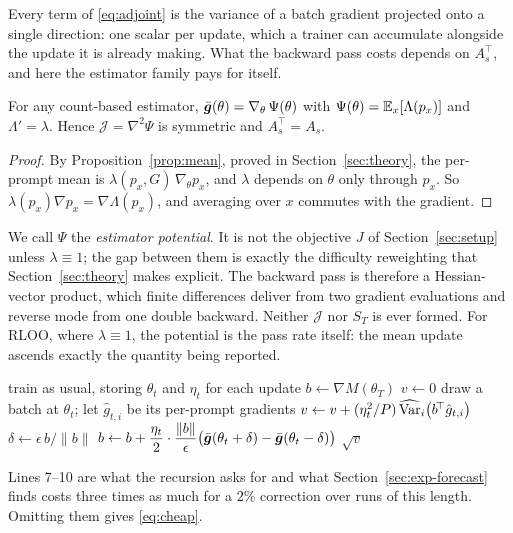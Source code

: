Every term of \eqref{eq:adjoint} is the variance of a batch gradient projected onto a single
direction: one scalar per update, which a trainer can accumulate alongside the update it is
already making. What the backward pass costs depends on $A_s^{\!\top}$, and here the estimator
family pays for itself.

\begin{proposition}
  \label{prop:potential}
  For any count-based estimator, $\bar{\bm{g}}(\theta) = \nabla_\theta\,\Psi(\theta)$ with
  $\Psi(\theta) = \mathbb{E}_x[\Lambda(p_x)]$ and $\Lambda' = \lambda$. Hence $\mathcal{J} = \nabla^2\Psi$ is
  symmetric and $A_s^{\!\top} = A_s$.
\end{proposition}

\begin{proof}
  By Proposition~\ref{prop:mean}, proved in Section~\ref{sec:theory}, the per-prompt mean is
  $\lambda(p_x, G)\,\nabla_\theta p_x$, and
  $\lambda$ depends on $\theta$ only through $p_x$. So
  $\lambda(p_x)\nabla p_x = \nabla \Lambda(p_x)$, and averaging over $x$ commutes with the
  gradient.
\end{proof}

We call $\Psi$ the \emph{estimator potential}. It is not the objective $J$ of
Section~\ref{sec:setup} unless $\lambda \equiv 1$; the gap between them is exactly the difficulty
reweighting that Section~\ref{sec:theory} makes explicit. The backward pass is therefore a
Hessian-vector product, which finite differences deliver from two gradient evaluations and reverse
mode from one double backward. Neither $\mathcal{J}$ nor $S_T$ is ever
formed. For RLOO, where $\lambda \equiv 1$, the potential is the pass rate itself: the mean update
ascends exactly the quantity being reported.

\begin{algorithm}[t]
\caption{The forecast, as a trainer would run it}
\label{alg:forecast}
\small
\begin{algorithmic}[1]
  \State train as usual, storing $\theta_t$ and $\eta_t$ for each update
  \State $b \gets \nabla M(\theta_T)$ 
  \State $v \gets 0$
    \State draw a batch at $\theta_t$; let $\hat{g}_{t,i}$ be its per-prompt gradients
    \State $v \gets v + (\eta_t^2/P)\,\widehat{\operatorname{Var}}_i\big(b^{\!\top}\hat{g}_{t,i}\big)$
      \State $\delta \gets \epsilon\, b/\|b\|$
      \State $b \gets b + \dfrac{\eta_t}{2}\cdot\dfrac{\|b\|}{\epsilon}
        \big(\bar{\bm{g}}(\theta_t + \delta) - \bar{\bm{g}}(\theta_t - \delta)\big)$
    \EndIf
  \EndFor
  \State \Return $\sqrt{v}$ 
\end{algorithmic}
\vspace{2pt}
{\footnotesize Lines 7--10 are what the recursion asks for and what
Section~\ref{sec:exp-forecast} finds costs three times as much for a $2\%$ correction over runs of
this length. Omitting them gives \eqref{eq:cheap}.}
\end{algorithm}

